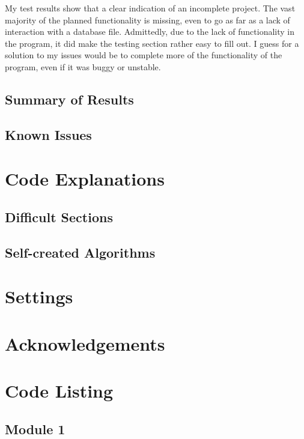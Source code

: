 My test results show that a clear indication of an incomplete project. The vast majority of the planned functionality is missing, even to go as far as a lack of interaction with a database file. Admittedly, due to the lack of functionality in the program, it did make the testing section rather easy to fill out. I guess for a solution to my issues would be to complete more of the functionality of the program, even if it was buggy or unstable.
\subsection{Summary of Results}

\subsection{Known Issues}

\section{Code Explanations}

\subsection{Difficult Sections}

\subsection{Self-created Algorithms}

\section{Settings}

\section{Acknowledgements}

\section{Code Listing}
\begin{landscape}
\subsection{Module 1}
\begin{comment}
\pythonfile[firstline=5]{./tex/function_programs/print_function.py}
\end{comment}
\end{landscape}

